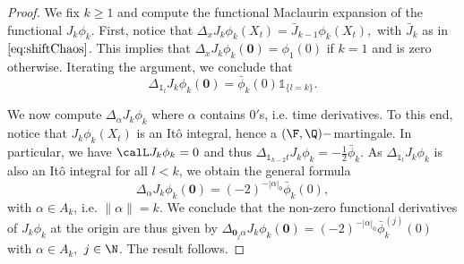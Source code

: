  \begin{proof}
We fix $k\ge 1$ and compute the functional Maclaurin expansion of the functional $J_k \phi_k$. %
First,  notice that %
$\Delta_x J_k \phi_k (X_t) = \bar{J}_{k-1} \phi_k  (X_t),$
with $\bar{J}_k$ as in $\eqref{eq:shiftChaos}$. This implies that $\Delta_x J_k \phi_k (\boldsymbol{0}) = \phi_1(0)$ if $k=1$ and is zero otherwise.    %
Iterating the argument, we conclude that 
$$\Delta_{\mathds{1}_l} J_k \phi_k (\boldsymbol{0}) =  \bar{\phi}_k (0) \mathds{1}_{\{l=k\}}. $$ 

We now compute $\Delta_{\alpha} J_k \phi_k $ where $\alpha$ contains $0'$s, i.e.  time derivatives. 
To this end, notice that $J_k \phi_k(X_t)$ is an It\^o integral, hence a $(\F,\Q)-$martingale. In particular, we have $\calL J_k \phi_k = 0$ and thus  $\Delta_{\mathds{1}_{k-2} t} J_k \phi_k = -\frac{1}{2} \bar{\phi}_k $. As $\Delta_{\mathds{1}_{l}} J_k \phi_k$ is also an It\^o integral for all $l < k$, we obtain the general formula $$\Delta_{\alpha} J_k \phi_k (\boldsymbol{0}) = (-2)^{-|\alpha|_{0}} \bar{\phi}_k(0), $$
with $\alpha \in A_k$, i.e. $\lVert \alpha \rVert =k$. 
We conclude that the  non-zero functional derivatives of $J_k \phi_k$ at the origin are thus given by 
 $\Delta_{\boldsymbol{0}_j\alpha} J_k\phi_k(\boldsymbol{0}) = (-2)^{-|\alpha|_{0}} \bar{\phi}^{(j)}_k(0)$ with $\alpha \in A_k,$ $j\in \N$. The result  follows. 



 \end{proof}
 

